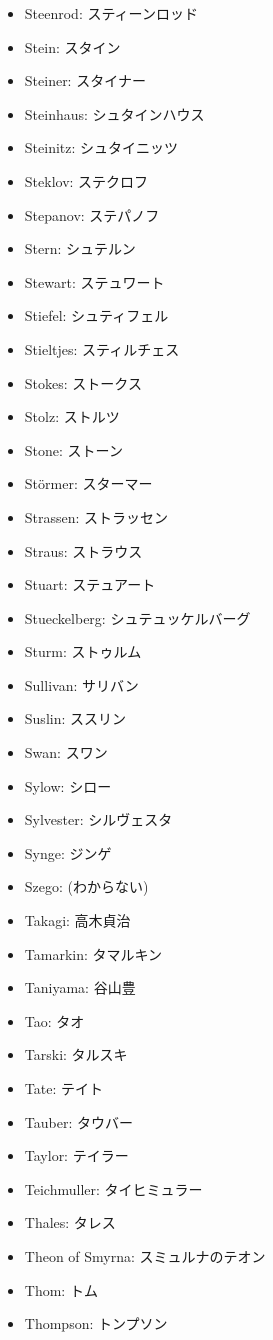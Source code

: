 \documentclass[openany, a4paper, oneside]{jsbook}
\begin{document}
\begin{itemize}
\item Steenrod: スティーンロッド
\item Stein: スタイン
\item Steiner: スタイナー
\item Steinhaus: シュタインハウス
\item Steinitz: シュタイニッツ
\item Steklov: ステクロフ
\item Stepanov: ステパノフ
\item Stern: シュテルン
\item Stewart: ステュワート
\item Stiefel: シュティフェル
\item Stieltjes: スティルチェス
\item Stokes: ストークス
\item Stolz: ストルツ
\item Stone: ストーン
\item St\"ormer: スターマー
\item Strassen: ストラッセン
\item Straus: ストラウス
\item Stuart: ステュアート
\item Stueckelberg: シュテュッケルバーグ
\item Sturm: ストゥルム
\item Sullivan: サリバン
\item Suslin: ススリン
\item Swan: スワン
\item Sylow: シロー
\item Sylvester: シルヴェスタ
\item Synge: ジンゲ
\item Szego: (わからない)
\item Takagi: 高木貞治
\item Tamarkin: タマルキン
\item Taniyama: 谷山豊
\item Tao: タオ
\item Tarski: タルスキ
\item Tate: テイト
\item Tauber: タウバー
\item Taylor: テイラー
\item Teichmuller: タイヒミュラー
\item Thales: タレス
\item Theon of Smyrna: スミュルナのテオン
\item Thom: トム
\item Thompson: トンプソン

\end{itemize}
\end{document}
